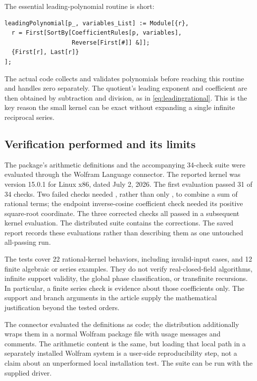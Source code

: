 \documentclass[11pt,letterpaper]{article}
\theoremstyle{definition}
\newcommand{\code}[1]{\texttt{\detokenize{#1}}}
\numberwithin{equation}{section}
\begin{document}
The essential leading-polynomial routine is short:
\begin{lstlisting}
leadingPolynomial[p_, variables_List] := Module[{r},
  r = First[SortBy[CoefficientRules[p, variables],
                   Reverse[First[#]] &]];
  {First[r], Last[r]}
];
\end{lstlisting}
The actual code collects and validates polynomials before reaching this routine and handles zero separately. The quotient's leading exponent and coefficient are then obtained by subtraction and division, as in \eqref{eq:leadingrational}. This is the key reason the small kernel can be exact without expanding a single infinite reciprocal series.

\subsection{Verification performed and its limits}\label{sec:verification}
The package's arithmetic definitions and the accompanying 34-check suite were evaluated through the Wolfram Language connector. The reported kernel was version 15.0.1 for Linux x86, dated July 2, 2026. The first evaluation passed 31 of 34 checks. Two failed checks needed \code{Together}, rather than only \code{Cancel}, to combine a sum of rational terms; the endpoint inverse-cosine coefficient check needed its positive square-root coordinate. The three corrected checks all passed in a subsequent kernel evaluation. The distributed suite contains the corrections. The saved report records these evaluations rather than describing them as one untouched all-passing run.

The tests cover 22 rational-kernel behaviors, including invalid-input cases, and 12 finite algebraic or series examples. They do not verify real-closed-field algorithms, infinite support validity, the global phase classification, or transfinite recursions. In particular, a finite series check is evidence about those coefficients only. The support and branch arguments in the article supply the mathematical justification beyond the tested orders.

The connector evaluated the definitions as code; the distribution additionally wraps them in a normal Wolfram package file with usage messages and comments. The arithmetic content is the same, but loading that local path in a separately installed Wolfram system is a user-side reproducibility step, not a claim about an unperformed local installation test. The suite can be run with the supplied \code{RunChecks.wl} driver.
\end{document}
